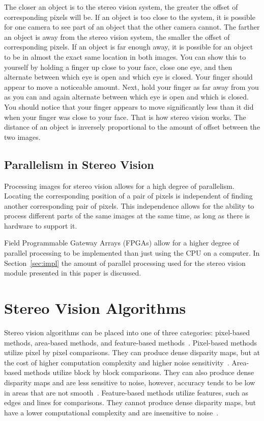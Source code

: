 The closer an object is to the stereo vision system, the greater the offset of corresponding pixels will be. If an object is too close to the system, it is possible for one camera to see part of an object that the other camera cannot. The farther an object is away from the stereo vision system, the smaller the offset of corresponding pixels. If an object is far enough away, it is possible for an object to be in almost the exact same location in both images. You can show this to yourself by holding a finger up close to your face, close one eye, and then alternate between which eye is open and which eye is closed. Your finger should appear to move a noticeable amount. Next, hold your finger as far away from you as you can and again alternate between which eye is open and which is closed. You should notice that your finger appears to move significantly less than it did when your finger was close to your face. That is how stereo vision works. The distance of an object is inversely proportional to the amount of offset between the two images.

\subsection{Parallelism in Stereo Vision}

Processing images for stereo vision allows for a high degree of parallelism. Locating the corresponding position of a pair of pixels is independent of finding another corresponding pair of pixels. This independence allows for the ability to process different parts of the same images at the same time, as long as there is hardware to support it.

Field Programmable Gateway Arrays (FPGAs) allow for a higher degree of parallel processing to be implemented than just using the CPU on a computer. In Section~\ref{sec:impl} the amount of parallel processing used for the stereo vision module presented in this paper is discussed. 

\section{Stereo Vision Algorithms}

Stereo vision algorithms can be placed into one of three categories: pixel-based methods, area-based methods, and feature-based methods~\cite{xilinxSpartan3ABoard}. Pixel-based methods utilize pixel by pixel comparisons. They can produce dense disparity maps, but at the cost of higher computation complexity and higher noise sensitivity~\cite{xilinxSpartan3ABoard}. Area-based methods utilize block by block comparisons. They can also produce dense disparity maps and are less sensitive to noise, however, accuracy tends to be low in areas that are not smooth~\cite{xilinxSpartan3ABoard}. Feature-based methods utilize features, such as edges and lines for comparisons. They cannot produce dense disparity maps, but have a lower computational complexity and are insensitive to noise~\cite{xilinxSpartan3ABoard}. 

